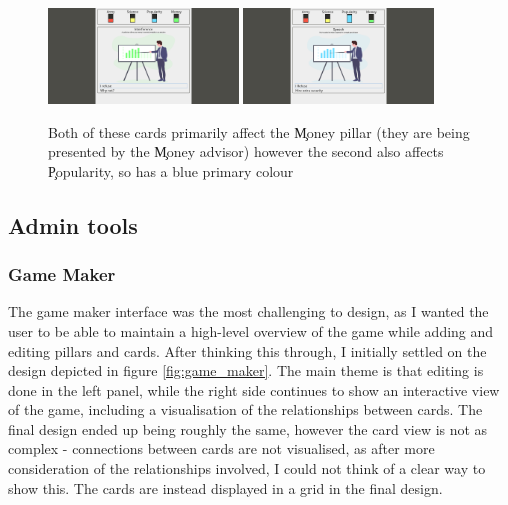 \begin{figure}[!h]
	\centering
	\includegraphics[width=0.45\textwidth]{./images/design/ecman_green.png}
	\includegraphics[width=0.45\textwidth]{./images/design/ecman_blue.png}
	\caption{Both of these cards primarily affect the \c{Money} pillar (they are being presented by the \c{Money} advisor) however the second also affects \c{Popularity}, so has a blue primary colour}
	\label{fig:colour_comp}
\end{figure}

\subsection{Admin tools}

\subsubsection{Game Maker}
The game maker interface was the most challenging to design, as I wanted the user to be able to maintain a high-level overview of the game while adding and editing pillars and cards.
After thinking this through, I initially settled on the design depicted in figure \ref{fig:game_maker}. The main theme is that editing is done in the left panel, while the right side continues to show an interactive view of the game, including a visualisation of the relationships between cards.
The final design ended up being roughly the same, however the card view is not as complex - connections between cards are not visualised, as after more consideration of the relationships involved, I could not think of a clear way to show this.
The cards are instead displayed in a grid in the final design.

